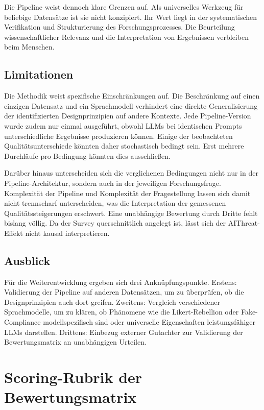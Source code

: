 \documentclass[11pt,a4paper]{article}
\begin{document}
Die Pipeline weist dennoch klare Grenzen auf. Als universelles Werkzeug für beliebige
Datensätze ist sie nicht konzipiert. Ihr Wert liegt in der systematischen Verifikation
und Strukturierung des Forschungsprozesses. Die Beurteilung wissenschaftlicher Relevanz
und die Interpretation von Ergebnissen verbleiben beim Menschen.

\subsection{Limitationen}

Die Methodik weist spezifische Einschränkungen auf. Die Beschränkung auf einen
einzigen Datensatz und ein Sprachmodell verhindert eine direkte Generalisierung
der identifizierten Designprinzipien auf andere Kontexte. Jede Pipeline-Version
wurde zudem nur einmal ausgeführt, obwohl LLMs bei identischen Prompts
unterschiedliche Ergebnisse produzieren können. Einige der beobachteten
Qualitätsunterschiede könnten daher stochastisch bedingt sein. Erst mehrere
Durchläufe pro Bedingung könnten dies ausschließen.

Darüber hinaus unterscheiden sich die verglichenen Bedingungen nicht nur in der
Pipeline-Architektur, sondern auch in der jeweiligen Forschungsfrage. Komplexität
der Pipeline und Komplexität der Fragestellung lassen sich damit nicht trennscharf
unterscheiden,
was die Interpretation der gemessenen Qualitätssteigerungen erschwert. Eine
unabhängige Bewertung durch Dritte fehlt bislang völlig. Da der Survey querschnittlich angelegt ist, lässt sich der AIThreat-Effekt nicht
kausal interpretieren.

\subsection{Ausblick}

Für die Weiterentwicklung ergeben sich drei Anknüpfungspunkte. Erstens: Validierung
der Pipeline auf anderen Datensätzen, um zu überprüfen, ob die Designprinzipien auch
dort greifen. Zweitens: Vergleich verschiedener Sprachmodelle, um zu klären, ob
Phänomene wie die Likert-Rebellion oder Fake-Compliance modellspezifisch sind oder
universelle Eigenschaften leistungsfähiger LLMs darstellen. Drittens: Einbezug
externer Gutachter zur Validierung der Bewertungsmatrix an unabhängigen Urteilen.




\clearpage
\appendix

\section{Scoring-Rubrik der Bewertungsmatrix}
\label{app:rubrik}
\end{document}
